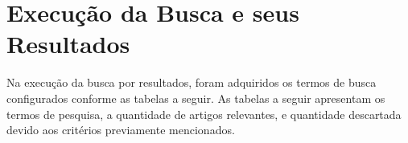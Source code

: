 \section{Execução da Busca e seus Resultados}

Na execução da busca por resultados, foram adquiridos os termos de busca  configurados conforme as tabelas a seguir. As tabelas a seguir apresentam os termos de pesquisa, a quantidade de artigos relevantes, e quantidade descartada devido aos critérios previamente mencionados.


\begin{table}[!htb]
\caption{Extração de resultados pela Science Direct}
\begin{center}
{
\footnotesize
{}
}
\end{center}
\label{tab:extracao-ScienceDirect}
\end{table}


\begin{table}[!htb]
\caption{Extração de resultados pela IEEEXplore}
\begin{center}
{
\footnotesize
{}
}
\end{center}
\label{tab:extracao-IEEEXplore}
\end{table}


\begin{table}[!htb]
\caption{Extração de resultados pela Google Scholar}
\begin{center}
{
\footnotesize
{}
}
\end{center}
\label{tab:extracao-GoogleScholar}
\end{table}

